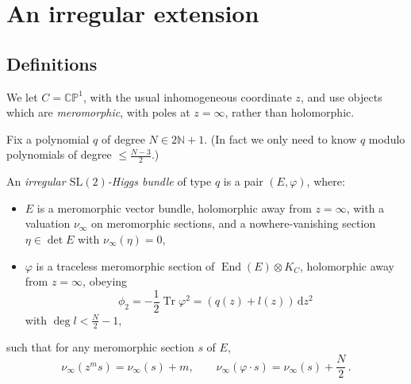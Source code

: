 \documentclass[12pt,letterpaper,reqno]{article}
\numberwithin{equation}{section}
\newcommand{\bbC}{\ensuremath{\mathbb C}}
\newcommand{\bbN}{\ensuremath{\mathbb N}}
\newcommand{\bbP}{\ensuremath{\mathbb P}}
\newcommand{\de}{\mathrm{d}}
\newcommand{\ti}[1]{\textit{#1}}
\DeclareMathOperator{\Tr}{Tr}
\DeclareMathOperator{\End}{End}
\newcommand{\SL}{\mathrm{SL}}
\begin{document}
\section{An irregular extension} \label{sec:irregular-extension}

\subsection{Definitions}

We let $C = \bbC\bbP^1$, with the usual inhomogeneous coordinate $z$, 
and use objects which are \ti{meromorphic},
with poles at $z = \infty$, rather than holomorphic.

Fix a polynomial $q$ of degree $N \in 2 \bbN + 1$.
(In fact we only need to know $q$ modulo polynomials of degree
$\le \frac{N-3}{2}$.)

\begin{defn}
An \ti{irregular $\SL(2)$-Higgs bundle} of type $q$ is
a pair $(E,\varphi)$, where:
\begin{itemize} 
  \item $E$ is a 
meromorphic vector bundle, holomorphic away from 
$z = \infty$, 
with a valuation $\nu_\infty$ on meromorphic sections,
and a nowhere-vanishing section $\eta \in \det E$ with $\nu_\infty(\eta) = 0$,
 \item $\varphi$ is a traceless meromorphic section of $\End(E) \otimes K_C$,
 holomorphic away from $z = \infty$, obeying 
\begin{equation} \label{eq:phi2-polynomial}
  \phi_2 = -\frac12 \Tr \varphi^2 = (q(z) + l(z)) \, \de z^2
\end{equation}
with $\deg l < \frac{N}{2} - 1$,
\end{itemize}
such that for any meromorphic section $s$ of $E$, 
\begin{equation}
\nu_\infty(z^{m} s) = \nu_\infty(s) + m, \qquad \nu_\infty(\varphi \cdot s) = \nu_\infty(s) + \frac{N}{2} \, .  
\end{equation}
\end{defn}
\end{document}
